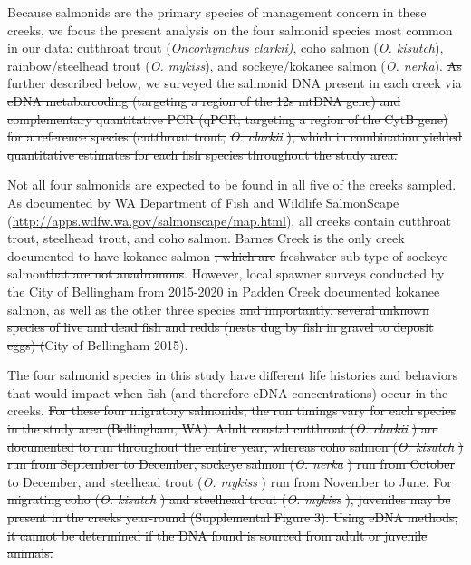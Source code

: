 \documentclass[
]{article}
\providecommand{\DIFaddtex}[1]{{\protect\color{blue}\uwave{#1}}} %
\providecommand{\DIFdeltex}[1]{{\protect\color{red}\sout{#1}}}                      %
\providecommand{\DIFaddbegin}{} %
\providecommand{\DIFaddend}{} %
\providecommand{\DIFdelbegin}{} %
\providecommand{\DIFdelend}{} %
\providecommand{\DIFadd}[1]{\texorpdfstring{\DIFaddtex{#1}}{#1}} %
\providecommand{\DIFdel}[1]{\texorpdfstring{\DIFdeltex{#1}}{}} %
\newcommand{\DIFscaledelfig}{0.5}
\newlength{\DIFdelgraphicswidth} %
\newlength{\DIFdelgraphicsheight} %
\newcommand{\DIFaddincludegraphics}[2][]{{\color{blue}\fbox{\DIFOincludegraphics[#1]{#2}}}} %
\newcommand{\DIFdelincludegraphics}[2][]{%
\sbox{\DIFdelgraphicsbox}{\DIFOincludegraphics[#1]{#2}}%
\settoboxwidth{\DIFdelgraphicswidth}{\DIFdelgraphicsbox} %
\settoboxtotalheight{\DIFdelgraphicsheight}{\DIFdelgraphicsbox} %
\scalebox{\DIFscaledelfig}{%
\parbox[b]{\DIFdelgraphicswidth}{\usebox{\DIFdelgraphicsbox}\\[-\baselineskip] \rule{\DIFdelgraphicswidth}{0em}}\llap{\resizebox{\DIFdelgraphicswidth}{\DIFdelgraphicsheight}{%
\setlength{\unitlength}{\DIFdelgraphicswidth}%
\begin{picture}(1,1)%
\thicklines\linethickness{2pt} %
{\color[rgb]{1,0,0}\put(0,0){\framebox(1,1){}}}%
{\color[rgb]{1,0,0}\put(0,0){\line( 1,1){1}}}%
{\color[rgb]{1,0,0}\put(0,1){\line(1,-1){1}}}%
\end{picture}%
}\hspace*{3pt}}} %
} %
\DeclareRobustCommand{\DIFaddbegin}{\DIFOaddbegin \let\includegraphics\DIFaddincludegraphics} %
\DeclareRobustCommand{\DIFaddend}{\DIFOaddend \let\includegraphics\DIFOincludegraphics} %
\DeclareRobustCommand{\DIFdelbegin}{\DIFOdelbegin \let\includegraphics\DIFdelincludegraphics} %
\DeclareRobustCommand{\DIFdelend}{\DIFOaddend \let\includegraphics\DIFOincludegraphics} %
\begin{document}
Because salmonids are the primary species of management concern in these
creeks, we focus the present analysis on the four salmonid species most
common in our data: cutthroat trout (\emph{Oncorhynchus clarkii)}, coho
salmon (\emph{O. kisutch}), rainbow/steelhead trout (\emph{O. mykiss}),
and sockeye/kokanee salmon (\emph{O. nerka}). \DIFdelbegin \DIFdel{As further described
below, we surveyed the salmonid DNA present in each creek via eDNA
metabarcoding (targeting a region of the 12s mtDNA gene) and
complementary quantitative PCR (qPCR; targeting a region of the CytB
gene) for a reference species (cutthroat trout, }\emph{\DIFdel{O. clarkii}}%
\DIFdel{),
which in combination yielded quantitative estimates for each fish
species throughout the study area.
}%

\DIFdelend Not all four salmonids are
expected to be found in all five of the creeks sampled. As documented by
WA Department of Fish and Wildlife SalmonScape
(\url{http://apps.wdfw.wa.gov/salmonscape/map.html}), all creeks contain
cutthroat trout, steelhead trout, and coho salmon. Barnes Creek is the
only creek documented to have kokanee salmon \DIFdelbegin \DIFdel{, which are
}\DIFdelend \DIFaddbegin \DIFadd{(a }\DIFaddend freshwater sub-type of
sockeye salmon\DIFdelbegin \DIFdel{that are not anadromous}\DIFdelend \DIFaddbegin \DIFadd{)}\DIFaddend . However, local spawner surveys conducted by the City of
Bellingham from 2015-2020 in Padden Creek documented kokanee salmon, as
well as the other three species \DIFdelbegin \DIFdel{and importantly, several unknown species of live and dead fish
and redds (nests dug by fish in gravel to deposit eggs) (}\DIFdelend \DIFaddbegin \DIFadd{(}\DIFaddend City of Bellingham 2015). \DIFdelbegin %

\DIFdelend The four
salmonid species in this study have different life histories and
behaviors that would impact when fish (and therefore eDNA
concentrations) occur in the creeks. \DIFdelbegin \DIFdel{For these four migratory salmonids,
the run timings vary for each species in the study area (Bellingham,
WA). Adult coastal cutthroat (}\emph{\DIFdel{O. clarkii}}%
\DIFdel{) are documented to run
throughout the entire year, whereas coho salmon (}\emph{\DIFdel{O. kisutch}}%
\DIFdel{) run
from September to December, sockeye salmon (}\emph{\DIFdel{O. nerka}}%
\DIFdel{) run from
October to December, and steelhead trout (}\emph{\DIFdel{O. mykiss}}%
\DIFdel{) run from
November to June. For migrating coho (}\emph{\DIFdel{O. kisutch}}%
\DIFdel{) and steelhead
trout (}\emph{\DIFdel{O. mykiss}}%
\DIFdel{), juveniles may be present in the creeks
year-round (Supplemental Figure 3). Using eDNA methods, it cannot be
determined if the DNA found is sourced from adult or juvenile animals.
}%
\end{document}
